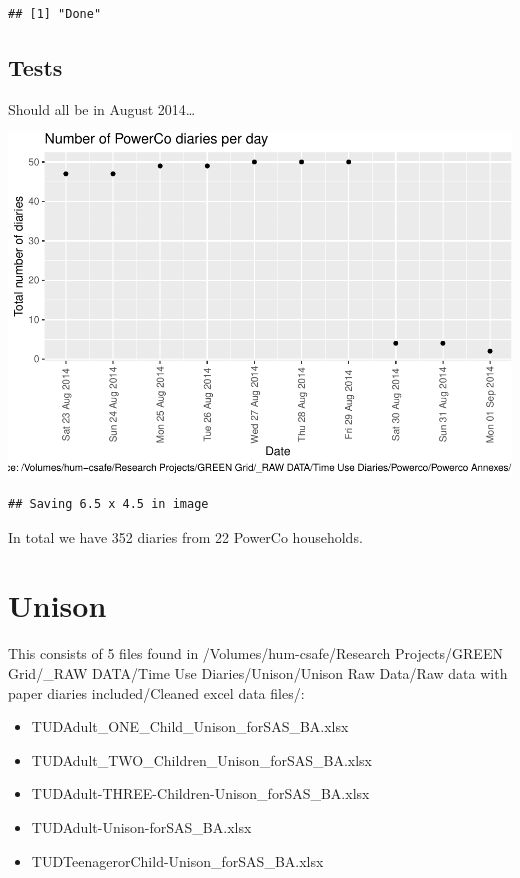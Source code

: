 \documentclass[]{article}
\providecommand{\tightlist}{%
  \setlength{\itemsep}{0pt}\setlength{\parskip}{0pt}}
\begin{document}
\begin{verbatim}
## [1] "Done"
\end{verbatim}

\subsection{Tests}\label{tests}

Should all be in August 2014\ldots{}

\includegraphics{processNZGGTUDData_files/figure-latex/powerCoDiaryPlot-1.pdf}

\begin{verbatim}
## Saving 6.5 x 4.5 in image
\end{verbatim}

In total we have 352 diaries from 22 PowerCo households.

\section{Unison}\label{unison}

This consists of 5 files found in /Volumes/hum-csafe/Research
Projects/GREEN Grid/\_RAW DATA/Time Use Diaries/Unison/Unison Raw
Data/Raw data with paper diaries included/Cleaned excel data files/:

\begin{itemize}
\tightlist
\item
  TUDAdult\_ONE\_Child\_Unison\_forSAS\_BA.xlsx
\item
  TUDAdult\_TWO\_Children\_Unison\_forSAS\_BA.xlsx
\item
  TUDAdult-THREE-Children-Unison\_forSAS\_BA.xlsx
\item
  TUDAdult-Unison-forSAS\_BA.xlsx
\item
  TUDTeenagerorChild-Unison\_forSAS\_BA.xlsx
\end{itemize}
\end{document}
